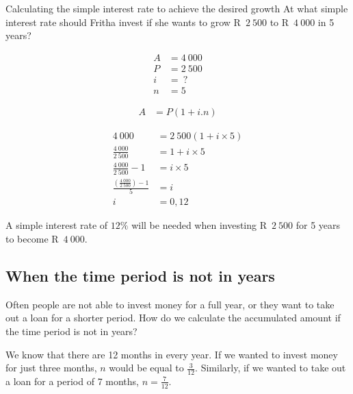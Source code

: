 \begin{wex}{Calculating the simple interest rate to achieve the desired growth}{
    At what simple interest rate should Fritha invest if she wants to grow R~$2~500$ to R~$4~000$ in 5 years?}{

    \begin{align*}
	A &= 4~000\\
	P &= 2~500\\
	i &= ~?\\
	n &= 5
    \end{align*}

    \begin{align*}
	A &= P(1 + i . n)
    \end{align*}

    \begin{align*}
	4~000 &= 2~500(1 + i \times 5)\\
	\frac{4~000}{2~500} &= 1 + i \times 5\\[5pt]
	\frac{4~000}{2~500} - 1&= i \times 5\\[5pt]
	\frac{(\frac{4~000}{2~500}) - 1}{5} &= i\\
	i &= 0,12
    \end{align*}

    A simple interest rate of $12\%$ will be needed when investing R~$2~500$ for 5 years to become R~$4~000$.
    }
\end{wex}


\subsection{When the time period is not in years}

Often people are not able to invest money for a full year, or they want to take out a loan for a shorter period. How do we calculate the accumulated amount if the time period is not in years?\par

We know that there are 12 months in every year. If we wanted to invest money for just three months, $n$ would be equal to $\frac{3}{12}$. Similarly, if we wanted to take out a loan for a period of 7 months, $n = \frac{7}{12}$.\\



